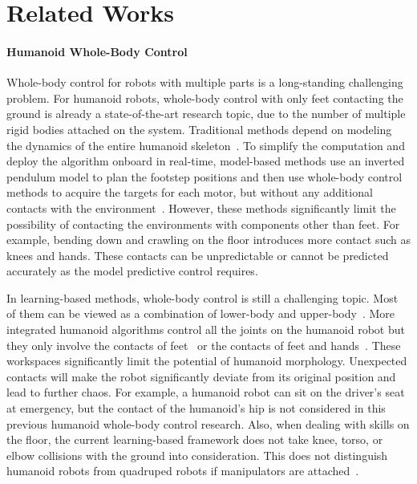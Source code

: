 \section{Related Works}
\paragraph{Humanoid Whole-Body Control}
Whole-body control for robots with multiple parts is a long-standing challenging problem. For humanoid robots, whole-body control with only feet contacting the ground is already a state-of-the-art research topic, due to the number of multiple rigid bodies attached on the system. Traditional methods depend on modeling the dynamics of the entire humanoid skeleton~\cite{matthew2021MIThumanoids, behzad2008whole, grizzle2009mabel, Moro2019whole, antonin2023synchronized, kajita2001the}. To simplify the computation and deploy the algorithm onboard in real-time, model-based methods use an inverted pendulum model to plan the footstep positions and then use whole-body control methods to acquire the targets for each motor, but without any additional contacts with the environment~\cite{Moro2019whole, kajita2001the}. However, these methods significantly limit the possibility of contacting the environments with components other than feet. For example, bending down and crawling on the floor introduces more contact such as knees and hands. These contacts can be unpredictable or cannot be predicted accurately as the model predictive control requires.

In learning-based methods, whole-body control is still a challenging topic. Most of them can be viewed as a combination of lower-body and upper-body~\cite{lu2024pmp, fu2024humanplus, cheng2024express, gu2024humanoid}. More integrated humanoid algorithms control all the joints on the humanoid robot but they only involve the contacts of feet~\cite{zhuang2024humanoid, ilija2024humanoid, serifi2024vmp, long2024learninghumanoidlocomotionperceptive, he2024learning, gu2024humanoid} or the contacts of feet and hands~\cite{zhang2024wococo, he2024omnih2o}. These workspaces significantly limit the potential of humanoid morphology. Unexpected contacts will make the robot significantly deviate from its original position and lead to further chaos. For example, a humanoid robot can sit on the driver's seat at emergency, but the contact of the humanoid's hip is not considered in this previous humanoid whole-body control research. Also, when dealing with skills on the floor, the current learning-based framework does not take knee, torso, or elbow collisions with the ground into consideration. This does not distinguish humanoid robots from quadruped robots if manipulators are attached~\cite{ma2022combining, zhang2024learning}.

